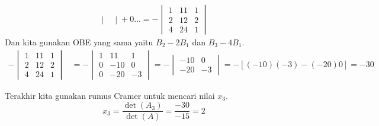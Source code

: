 \documentclass[10pt,openany,a4paper]{article}
\begin{document}
\begin{enumerate}
\begin{itemize}
\begin{align*}
\begin{vmatrix}
                \end{vmatrix}+0...=-\begin{vmatrix}
                    1 & 11 & 1\\
                    2 & 12 & 2\\
                    4 & 24 & 1
                \end{vmatrix}
            \end{align*}
            Dan kita gunakan OBE yang sama yaitu $B_2-2B_1$ dan $B_3-4B_1$.
            \begin{align*}
                -\begin{vmatrix}
                    1 & 11 & 1\\
                    2 & 12 & 2\\
                    4 & 24 & 1
                \end{vmatrix}&=-\begin{vmatrix}
                    1 & 11 & 1\\
                    0 & -10 & 0\\
                    0 & -20 & -3
                \end{vmatrix}=-\begin{vmatrix}
                    -10 & 0\\
                    -20 & -3
                \end{vmatrix}=-[(-10)(-3)-(-20)0]=-30
            \end{align*}
        \end{itemize}
        Terakhir kita gunakan rumus Cramer untuk mencari nilai $x_3$.
        \[x_3=\frac{\det(A_3)}{\det(A)}=\frac{-30}{-15}=2\]
    \end{enumerate}
\end{document}

